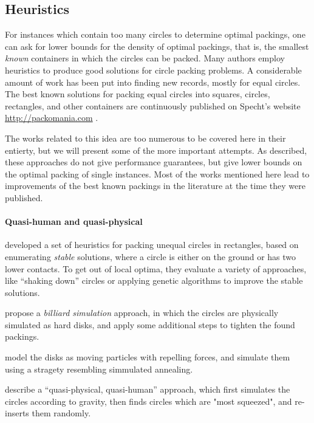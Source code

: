 \documentclass[a4paper,style=print,oneside,bibliography=totoc,nexus,lnum,extramargin]{tubsbook}
\begin{document}
\subsection{Heuristics}

For instances which contain too many circles to determine optimal packings, one can ask for lower bounds for the density of optimal packings, that is, the smallest \emph{known} containers in which the circles can be packed.
Many authors employ heuristics to produce good solutions for circle packing problems.
A considerable amount of work has been put into finding new records, mostly for equal circles. The best known solutions for packing equal circles into squares, circles, rectangles, and other containers are continuously published on Specht's website \url{http://packomania.com} \cite{specht2015packomania}.

The works related to this idea are too numerous to be covered here in their entierty, but we will present some of the more important attempts. As described, these approaches do not give performance guarantees, but give lower bounds on the optimal packing of single instances. Most of the works mentioned here lead to improvements of the best known packings in the literature at the time they were published.

\paragraph{Quasi-human and quasi-physical}

\textcite{GGL1995packing} developed a set of heuristics for packing unequal circles in rectangles, based on enumerating \emph{stable} solutions, where a circle is either on the ground or has two lower contacts. To get out of local optima, they evaluate a variety of approaches, like “shaking down” circles or applying genetic algorithms to improve the stable solutions.

\textcite{GLNO1998dense} propose a \emph{billiard simulation} approach, in which the circles are physically simulated as hard disks, and apply some additional steps to tighten the found packings.

\textcite{BDGL2000improving} model the disks as moving particles with repelling forces, and simulate them using a stragety resembling simmulated annealing.

\textcite{WHZX2002improved} describe a “quasi-physical, quasi-human” approach, which first simulates the circles according to gravity, then finds circles which are "most squeezed", and re-inserts them randomly.
\end{document}
